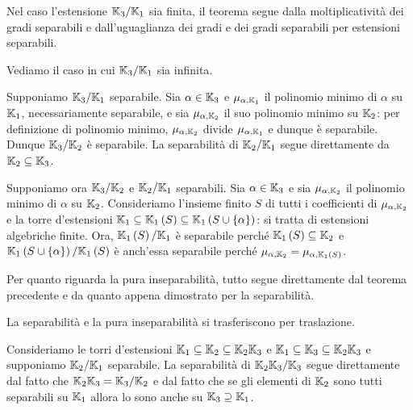 \Proof Nel caso l'estensione $\mathbb{K}_3/\mathbb{K}_1$ sia finita, il teorema segue dalla moltiplicativit\`a dei gradi separabili e dall'uguaglianza dei gradi e dei gradi separabili per estensioni separabili.
\par Vediamo il caso in cui $\mathbb{K}_3/\mathbb{K}_1$ sia infinita.
\par Supponiamo $\mathbb{K}_3/\mathbb{K}_1$ separabile. Sia $\alpha \in \mathbb{K}_3$ e $\MinimalPolynomial{\alpha}[\Field_1]$ il polinomio minimo di $\alpha$ su $\mathbb{K}_1$, necessariamente separabile, e sia $\MinimalPolynomial{\alpha}[\Field_2]$ il suo polinomio minimo su $\mathbb{K}_2$: per definizione di polinomio minimo, $\MinimalPolynomial{\alpha}[\Field_2]$ divide $\MinimalPolynomial{\alpha}[\Field_1]$ e dunque \`e separabile. Dunque $\mathbb{K}_3/\mathbb{K}_2$ \`e separabile. La separabilit\`a di $\mathbb{K}_2/\mathbb{K}_1$ segue direttamente da $\mathbb{K}_2 \subseteq \mathbb{K}_3$.
\par Supponiamo ora $\mathbb{K}_3/\mathbb{K}_2$ e $\mathbb{K}_2/\mathbb{K}_1$ separabili. Sia $\alpha \in \mathbb{K}_3$ e sia $\MinimalPolynomial{\alpha}[\Field_2]$ il polinomio minimo di $\alpha$ su $\mathbb{K}_2$. Consideriamo l'insieme finito $S$ di tutti i coefficienti di $\MinimalPolynomial{\alpha}[\Field_2]$ e la torre d'estensioni $\mathbb{K}_1 \subseteq \mathbb{K}_1 \left ( S \right ) \subseteq \mathbb{K}_1 \left ( S \cup \lbrace \alpha \rbrace \right )$: si tratta di estensioni algebriche finite. Ora, $\mathbb{K}_1 \left ( S \right )/\mathbb{K}_1$ \`e separabile perch\'e $\mathbb{K}_1 \left ( S \right ) \subseteq \mathbb{K}_2$ e $\mathbb{K}_1 \left ( S \cup \lbrace \alpha \rbrace \right )/\mathbb{K}_1 \left ( S \right )$ \`e anch'essa separabile perch\'e $\MinimalPolynomial{\alpha}[\Field_2] = \MinimalPolynomial{\alpha}[\FieldAdjunction{\Field_1}{S}]$.
\par Per quanto riguarda la pura inseparabilit\`a, tutto segue direttamente dal teorema precedente e da quanto appena dimostrato per la separabilit\`a. \EndProof
\begin{Theorem}
	La separabilit\`a  e la pura inseparabilit\`a si trasferiscono per traslazione. 
\end{Theorem}
\Proof Consideriamo le torri d'estensioni $\mathbb{K}_1 \subseteq \mathbb{K}_2 \subseteq \mathbb{K}_2\mathbb{K}_3$ e $\mathbb{K}_1 \subseteq \mathbb{K}_3 \subseteq \mathbb{K}_2\mathbb{K}_3$ e supponiamo $\mathbb{K}_2/\mathbb{K}_1$ separabile. La separabilit\`a di $\mathbb{K}_2\mathbb{K}_3/\mathbb{K}_3$ segue direttamente dal fatto che $\mathbb{K}_2\mathbb{K}_3 = \mathbb{K}_3/\mathbb{K}_2$ e dal fatto che se gli elementi di $\mathbb{K}_2$ sono tutti separabili su $\mathbb{K}_1$ allora lo sono anche su $\mathbb{K}_3 \supseteq \mathbb{K}_1$.
